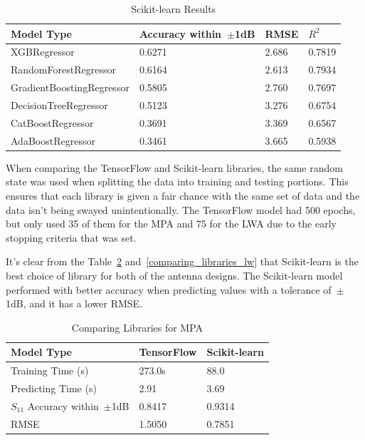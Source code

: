 \documentclass[conference]{IEEEtran}
\begin{document}
\begin{table}[h]
\caption{Scikit-learn Results}
\begin{center}
\begin{tabular}{ |l|l|l|l| }
    \hline
    Model Type & Accuracy within~$\pm$1dB & RMSE & $R^2$ \\ 
    \hline
    XGBRegressor & 0.6271 & 2.686 & 0.7819 \\  
    \hline
    RandomForestRegressor & 0.6164 & 2.613 & 0.7934 \\
    \hline  
    GradientBoostingRegressor & 0.5805 & 2.760 & 0.7697 \\
    \hline
    DecisionTreeRegressor & 0.5123 & 3.276 & 0.6754 \\  
    \hline
    CatBoostRegressor & 0.3691 & 3.369 & 0.6567 \\    
    \hline
    AdaBoostRegressor & 0.3461 & 3.665 & 0.5938 \\  
    \hline
\end{tabular}
\end{center}
\label{comparing_sklearn_lw}
\end{table}

When comparing the TensorFlow and Scikit-learn libraries, the same random state was used when splitting the data into training and testing portions. This ensures that each library is given a fair chance with the same set of data and the data isn't being swayed unintentionally. The TensorFlow model had 500 epochs, but only used 35 of them for the MPA and 75 for the LWA due to the early stopping criteria that was set. 

It's clear from the Table~\ref{comparing_libraries_p} and~\ref{comparing_libraries_lw} that Scikit-learn is the best choice of library for both of the antenna designs. The Scikit-learn model performed with better accuracy when predicting values with a tolerance of~$\pm$1dB, and it has a lower RMSE.

\begin{table}[h]
\caption{Comparing Libraries for MPA}
\begin{center}
\begin{tabular}{ |l|l|l| }
    \hline
    Model Type & TensorFlow & Scikit-learn \\ 
    \hline
    Training Time (s) & 273.0s & 88.0 \\  
    \hline
    Predicting Time (s) & 2.91 & 3.69 \\
    \hline
    $S_{11}$ Accuracy within~$\pm$1dB & 0.8417 & 0.9314 \\
    \hline
    RMSE & 1.5050 & 0.7851 \\
    \hline
\end{tabular}
\end{center}
\label{comparing_libraries_p}
\end{table}
\end{document}
